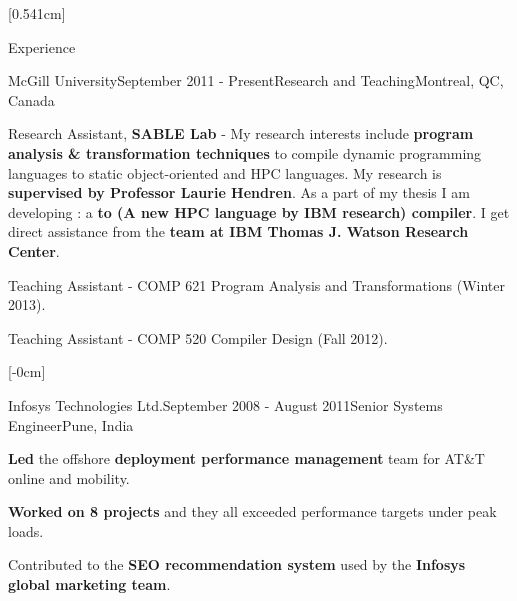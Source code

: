 \documentclass{resume} %
\begin{document}
[0.541cm]%
\begin{rSection}{Experience}
\begin{rSubsection}{McGill University}{September 2011 - Present}{Research and Teaching}{Montreal, QC, Canada}
\item Research Assistant, \textbf{SABLE Lab} - My research interests include \textbf{program analysis \& transformation techniques} to compile dynamic 
programming languages to static object-oriented and HPC languages. My research is \textbf{supervised by Professor Laurie Hendren}. As a part of my thesis 
I am developing \mixten: a \textbf{\matlab to \xten (A new HPC language by IBM research) compiler}. I get direct assistance 
from the \textbf{\xten team at IBM Thomas J. Watson Research Center}.   
\item Teaching Assistant - COMP 621 Program Analysis and Transformations (Winter 2013). 
\item Teaching Assistant - COMP 520 Compiler Design (Fall 2012).
\end{rSubsection}

[-0cm]
\begin{rSubsection}{Infosys Technologies Ltd.}{September 2008 - August 2011}{Senior Systems Engineer}{Pune, India}
\item \textbf{Led} the offshore \textbf{deployment performance management} team for AT\&T online and mobility.
\item \textbf{Worked on 8 projects} and they all exceeded performance targets under peak loads.
\item Contributed to the \textbf{SEO recommendation system} used by the \textbf{Infosys global marketing team}.
\end{rSubsection}


\end{rSection}
\end{document}
